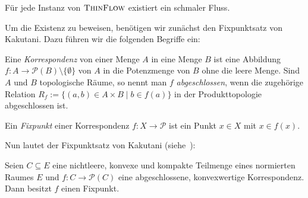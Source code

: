 \begin{theorem}\label{thm-existence-thin-flow}
	Für jede Instanz von $\textsc{ThinFlow}$ existiert ein schmaler Fluss.
\end{theorem}

Um die Existenz zu beweisen, benötigen wir zunächst den Fixpunktsatz von Kakutani.
Dazu führen wir die folgenden Begriffe ein:

\begin{definition}
	Eine \emph{Korrespondenz} von einer Menge $A$ in eine Menge $B$ ist eine Abbildung $f: A \to \mathcal{P}(B)\setminus \{ \emptyset \}$ von $A$ in die Potenzmenge von $B$ ohne die leere Menge.
	Sind $A$ und $B$ topologische Räume, so nennt man $f$ \emph{abgeschlossen}, wenn die zugehörige Relation $R_f := \{ (a,b) \in A\times B \mid b\in f(a)  \}$ in der Produkttopologie abgeschlossen ist.

	Ein \emph{Fixpunkt} einer Korrespondenz $f: X \to \mathcal{P}$ ist ein Punkt $x\in X$ mit $x\in f(x)$.
\end{definition}

Nun lautet der Fixpunktsatz von Kakutani (siehe~\cite{Heuser1991Fix}):

\begin{satz}\label{satz-kakutani}
	Seien $C\subseteq E$ eine nichtleere, konvexe und kompakte Teilmenge eines normierten Raumes $E$ und $f: C \to \mathcal{P}(C)$ eine abgeschlossene, konvexwertige Korrespondenz.
	Dann besitzt $f$ einen Fixpunkt.
\end{satz}

